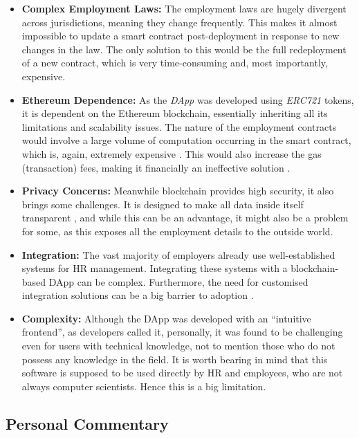 \begin{itemize}
    \item \textbf{Complex Employment Laws:}
    The employment laws are hugely divergent across jurisdictions, meaning they change frequently. This makes it almost impossible to update a smart contract post-deployment \cite{MagazzeniEtAl2017} in response to new changes in the law. The only solution to this would be the full redeployment of a new contract, which is very time-consuming and, most importantly, expensive.
    \item \textbf{Ethereum Dependence:} 
    As the \textit{DApp} was developed using \textit{ERC721} tokens, it is dependent on the Ethereum blockchain, essentially inheriting all its limitations and scalability issues. The nature of the employment contracts would involve a large volume of computation occurring in the smart contract, which is, again, extremely expensive \cite{Buterin2014}. This would also increase the gas (transaction) fees, making it financially an ineffective solution \cite{Buterin2014}.
    \item \textbf{Privacy Concerns:} Meanwhile blockchain provides high security, it also brings some challenges. It is designed to make all data inside itself transparent \cite{Mik2017}, and while this can be an advantage, it might also be a problem for some, as this exposes all the employment details to the outside world.  
    \item \textbf{Integration:} The vast majority of employers already use well-established systems for HR management. Integrating these systems with a blockchain-based DApp can be complex. Furthermore, the need for customised integration solutions can be a big barrier to adoption \cite{AllenEtAl2022}.
    \item \textbf{Complexity:} Although the DApp was developed with an ``intuitive frontend'', as developers called it, personally, it was found to be challenging even for users with technical knowledge, not to mention those who do not possess any knowledge in the field. It is worth bearing in mind that this software is supposed to be used directly by HR and employees, who are not always computer scientists. Hence this is a big limitation. 
\end{itemize}

\subsection{Personal Commentary}

